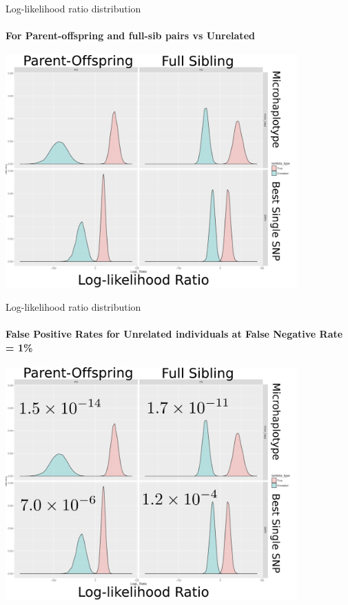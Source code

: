 \documentclass[letter,graphicx]{beamer}
\begin{document}
\begin{frame}{Log-likelihood ratio distribution}
\framesubtitle{For Parent-offspring and full-sib pairs vs Unrelated}
\begin{center}
\includegraphics[width = 0.84\textwidth]{mhap_figs/loglrats.pdf}
\end{center}

\end{frame}













\begin{frame}{Log-likelihood ratio distribution}
\framesubtitle{False Positive Rates for Unrelated individuals at False Negative Rate = 1\%}
\begin{center}
\includegraphics[width = 0.84\textwidth]{mhap_figs/loglrats-FPR.pdf}
\end{center}

\end{frame}
\end{document}
